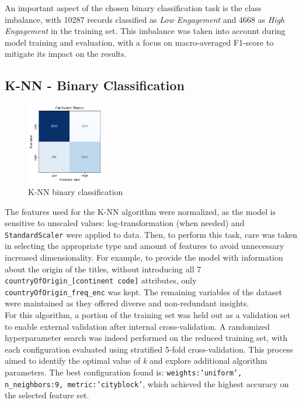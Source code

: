 An important aspect of the chosen binary classification task is the class imbalance, with 10287 records
classified as \textit{Low Engagement} and 4668 as \textit{High Engagement} in the training set.
This imbalance was taken into account during model training and evaluation, with a focus on
macro-averaged F1-score to mitigate its impact on the results.\\

\subsection{K-NN - Binary Classification}

\begin{figure}
    \centering
    \includegraphics[width=0.30\textwidth]{plots/knn_binary_confmatrix.png}
    \caption{K-NN binary classification}
    \label{fig:binary_knn_confusion_matrix}
\end{figure}
The features used for the K-NN algorithm were normalized, as the model is sensitive to unscaled values: log-transformation (when needed) and \texttt{StandardScaler} were applied to data. 
Then, to perform this task, care was taken in selecting the appropriate type and amount of features to avoid unnecessary increased dimensionality.
For example, to provide the model with information about the origin of the titles, without introducing all 7 \texttt{countryOfOrigin\_[continent code]} attributes, only \texttt{countryOfOrigin\_freq\_enc} was kept. 
The remaining variables of the dataset were maintained as they offered diverse and non-redundant insights.\\
For this algorithm, a portion of the training set was held out as a validation set to enable external validation after internal cross-validation. 
A randomized hyperparameter search was indeed performed on the reduced training set, with each configuration evaluated using stratified 5-fold cross-validation. 
This process aimed to identify the optimal value of \textit{k} and explore additional algorithm parameters. 
The best configuration found is: \texttt{weights:'uniform', n\_neighbors:9, metric:'cityblock'}, which achieved the highest accuracy on the selected feature set.\\


